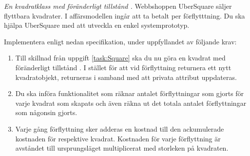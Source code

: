 \Task \emph{En kvadratklass med föränderligt tillstånd .} Webbshoppen UberSquare säljer flyttbara kvadrater. I affärsmodellen ingår att ta betalt per förflytttning. Du ska hjälpa UberSquare med att utveckla en enkel systemprototyp. 

\Subtask Implementera  enligt nedan specifikation, under uppfyllandet av följande krav:

\begin{enumerate}
\item Till skillnad från uppgift \ref{task:Square} ska du nu göra en kvadrat med föränderligt tillstånd . I stället för att vid förflyttning returnera ett nytt kvadratobjekt, returneras  i samband med att privata attribut uppdateras.
\item Du ska införa funktionalitet som räknar antalet förflyttningar som gjorts för varje kvadrat som skapats och även räkna ut det totala antalet förflyttningar som någonsin gjorts.
\item Varje gång förflyttning sker adderas en kostnad till den ackumulerade kostnaden för respektive kvadrat. Kostnaden för varje förflyttning är avståndet till ursprungsläget multiplicerat med storleken på kvadraten.
\end{enumerate}

